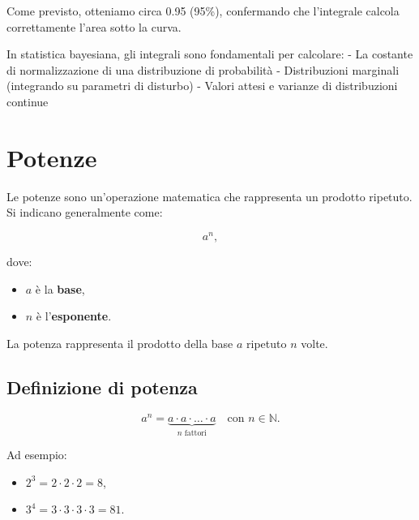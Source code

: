 \documentclass[
  italian,
  letterpaper,
  a4paper,
  11pt,
  open=any]{scrbook}
\providecommand{\tightlist}{%
  \setlength{\itemsep}{0pt}\setlength{\parskip}{0pt}}
\theoremstyle{plain}
\theoremstyle{definition}
\theoremstyle{definition}
\theoremstyle{remark}
\begin{document}
Come previsto, otteniamo circa 0.95 (95\%), confermando che l'integrale
calcola correttamente l'area sotto la curva.

\begin{tcolorbox}[enhanced jigsaw, arc=.35mm, bottomrule=.15mm, bottomtitle=1mm, breakable, colback=white, colbacktitle=quarto-callout-tip-color!10!white, colframe=quarto-callout-tip-color-frame, coltitle=black, left=2mm, leftrule=.75mm, opacityback=0, opacitybacktitle=0.6, rightrule=.15mm, title=\textcolor{quarto-callout-tip-color}{\faLightbulb}\hspace{0.5em}{Collegamento alla probabilità}, titlerule=0mm, toprule=.15mm, toptitle=1mm]

In statistica bayesiana, gli integrali sono fondamentali per calcolare:
- La costante di normalizzazione di una distribuzione di probabilità -
Distribuzioni marginali (integrando su parametri di disturbo) - Valori
attesi e varianze di distribuzioni continue

\end{tcolorbox}

\section{Potenze}\label{potenze}

Le potenze sono un'operazione matematica che rappresenta un prodotto
ripetuto. Si indicano generalmente come:

\[
a^n,
\]

dove:

\begin{itemize}
\tightlist
\item
  \(a\) è la \textbf{base},
\item
  \(n\) è l'\textbf{esponente}.
\end{itemize}

La potenza rappresenta il prodotto della base \(a\) ripetuto \(n\)
volte.

\subsection{Definizione di potenza}\label{definizione-di-potenza}

\[
a^n = \underbrace{a \cdot a \cdot \dots \cdot a}_{n \text{ fattori}} \quad \text{con } n \in \mathbb{N}.
\]

Ad esempio:

\begin{itemize}
\tightlist
\item
  \(2^3 = 2 \cdot 2 \cdot 2 = 8\),
\item
  \(3^4 = 3 \cdot 3 \cdot 3 \cdot 3 = 81\).
\end{itemize}
\end{document}
